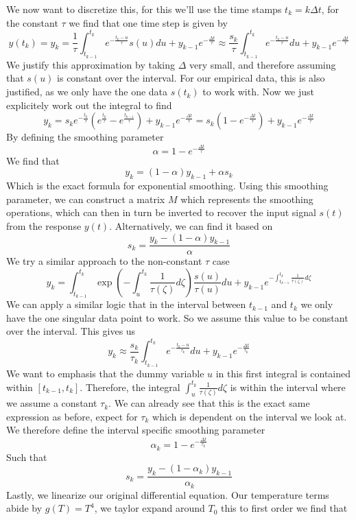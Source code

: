 \documentclass[]{scrartcl}
\begin{document}
We now want to discretize this, for this we'll use the time stamps $t_k = k\Delta t$, for the constant $\tau$ we find that one time step is given by
$$
y(t_k) = y_k= \frac{1}{\tau}\int_{t_{k-1}}^{t_k}e^{-\frac{t_k-u}{\tau}}s(u)du + y_{k-1}e^{-\frac{\Delta t}{\tau}} \approx \frac{s_k}{\tau}\int_{t_{k-1}}^{t_k}e^{-\frac{t_k-u}{\tau}}du + y_{k-1}e^{-\frac{\Delta t}{\tau}}
$$
We justify this approximation by taking $\Delta$ very small, and therefore assuming that $s(u)$ is constant over the interval. For our empirical data, this is also justified, as we only have the one data $s(t_k)$ to work with. Now we just explicitely work out the integral to find
$$
y_k = s_ke^{-\frac{t_k}{\tau}}\left(e^{\frac{t_k}{\tau}} - e^{\frac{t_{k-1}}{\tau}}\right) + y_{k-1}e^{-\frac{\Delta t}{\tau}} = s_k\left(1 - e^{-\frac{\Delta t}{\tau}}\right) + y_{k-1}e^{-\frac{\Delta t}{\tau}}
$$
By defining the smoothing parameter
$$
\alpha = 1 - e^{-\frac{\Delta t}{\tau}}
$$
We find that
$$
y_k = \left(1-\alpha\right)y_{k-1} + \alpha s_k
$$
Which is the exact formula for exponential smoothing. Using this smoothing parameter, we can construct a matrix $M$ which represents the smoothing operations, which can then in turn be inverted to recover the input signal $s(t)$ from the response $y(t)$. Alternatively, we can find it based on
$$
s_k = \frac{y_{k} - (1-\alpha) y_{k-1}}{\alpha}
$$
We try a similar approach to the non-constant $\tau$ case
$$
y_k = \int_{t_{k-1}}^{t_k} \exp(-\int_u^{t_k} \frac{1}{\tau(\zeta)}d\zeta)\frac{s(u)}{\tau(u)}du + y_{k-1}e^{-\int_{t_{k-1}}^{t_k}\frac{1}{\tau(\zeta)}d\zeta}
$$
We can apply a similar logic that in the interval between $t_{k-1}$ and $t_k$ we only have the one singular data point to work. So we assume this value to be constant over the interval. This gives us
$$
y_k \approx \frac{s_k}{\tau_k}\int_{t_{k-1}}^{t_k}e^{-\frac{t_k - u}{\tau_k}}du + y_{k-1}e^{-\frac{\Delta t}{\tau_k}}
$$
We want to emphasis that the dummy variable $u$ in this first integral is contained within $\left[t_{k-1}, t_k\right]$. Therefore, the integral $\int_u^{t_k} \frac{1}{\tau(\zeta)}d\zeta$ is within the interval where we assume a constant $\tau_k$. We can already see that this is the exact same expression as before, expect for $\tau_k$ which is dependent on the interval we look at. We therefore define the interval specific smoothing parameter
$$
\alpha_k = 1 - e^{-\frac{\Delta t}{\tau_k}}
$$
Such that
$$
s_k = \frac{y_k - (1 - \alpha_k)y_{k-1}}{\alpha_k}
$$
Lastly, we linearize our original differential equation. Our temperature terms abide by $g(T) = T^4$, we taylor expand around $T_0$ this to first order we find that
\end{document}
